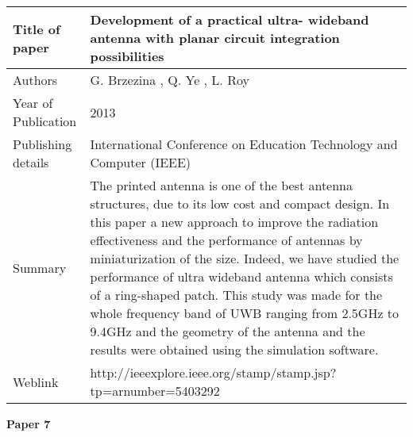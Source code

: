 		  \begin{center}
		  	\begin{table}[H]
		  		\centering
		  		\begin{tabular}{ |l|p{11cm}| }
		  			\hline
		  			Title of paper &  Development of a practical ultra- wideband antenna with planar circuit integration possibilities \\
		  			\hline
		  			Authors & G. Brzezina , Q. Ye , L. Roy \\
		  			\hline
		  			Year of Publication & 2013 \\
		  			\hline
		  			Publishing details & International Conference on Education Technology and Computer (IEEE) \\ \hline
		  			Summary & The printed antenna is one of the best antenna structures, due to its low cost and compact design. In this paper a new approach to improve the radiation effectiveness and the performance of antennas by miniaturization of the size. Indeed, we have studied the performance of ultra wideband antenna which consists of a ring-shaped patch. This study was made for the whole frequency band of UWB ranging from 2.5GHz to 9.4GHz and the geometry of the antenna and the results were obtained using the simulation software. \\
		  			\hline
		  			Weblink & http://ieeexplore.ieee.org/stamp/stamp.jsp?tp=arnumber=5403292 \\
		  			\hline			 
		  		\end{tabular}		
		  		
		  	\end{table}
		  \end{center}
		  
		\cleardoublepage
			
			\begin{flushleft}
				\textbf{Paper 7}
			\end{flushleft}
			

